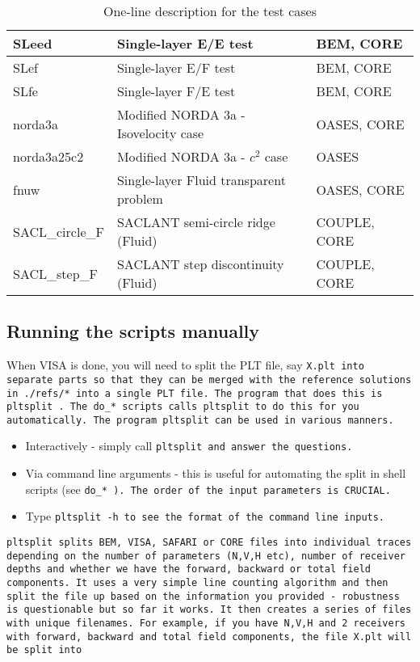 \begin{table}
\begin{center}
\begin{tabular}{|l|l|l|}
 SLeed       & Single-layer E/E test  		      & BEM, CORE    \\ \hline
 SLef        & Single-layer E/F test  		      & BEM, CORE    \\ \hline
 SLfe        & Single-layer F/E test  		      & BEM, CORE    \\ \hline
 norda3a     & Modified NORDA 3a - Isovelocity case   & OASES, CORE  \\ \hline
 norda3a25c2 & Modified NORDA 3a - $c^2$ case         & OASES  	     \\ \hline
 fnuw        & Single-layer Fluid transparent problem & OASES, CORE  \\ \hline
 SACL\_circle\_F & SACLANT semi-circle ridge (Fluid)  & COUPLE, CORE \\ \hline
 SACL\_step\_F   & SACLANT step discontinuity (Fluid) & COUPLE, CORE \\ \hline
\end{tabular}
\end{center}
\caption{One-line description for the test cases
	\label{casedesc} }
\end{table} 
 
\subsection{Running the scripts manually}
When VISA is done, you will need to split the PLT file, say 
\tt X.plt \rm into separate parts so that they can be merged 
with the reference solutions in \tt ./refs/* \rm 
into a single PLT file. 
The program that does this is \tt pltsplit \rm.
The \tt do\_* \rm scripts calls \tt pltsplit \rm to do this for you automatically. 
The program \tt pltsplit \rm can be used in various manners.
\begin{itemize}
\item Interactively - simply call \tt pltsplit \rm and answer the questions.
\item Via command line arguments - this is useful for automating the 
      split in shell scripts (see \tt do\_* \rm). The order of the 
      input parameters is CRUCIAL.
\item Type \tt pltsplit \rm -h to see the format of the command line inputs.
\end{itemize}
\tt pltsplit \rm splits BEM, VISA, SAFARI or CORE files into individual 
traces depending on the number of parameters (N,V,H etc), number of 
receiver depths and whether we have the forward, backward or 
total field components. It uses a very simple line counting algorithm 
and then split the file up based on the information you provided - 
robustness is questionable but so far it works. 
It then creates a series of files with unique filenames. 
For example, if you have N,V,H and 2 receivers with 
forward, backward and total field components, the file 
\tt X.plt \rm will be split into

